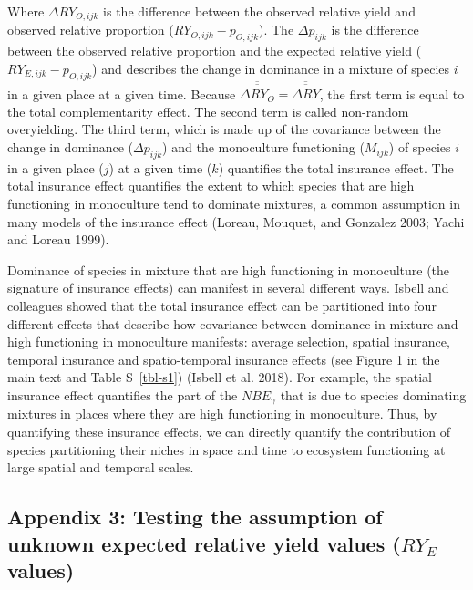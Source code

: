 \documentclass[
  letterpaper,
  DIV=11,
  numbers=noendperiod]{scrartcl}
\begin{document}
Where \(\Delta RY_{O, ijk}\) is the difference between the observed
relative yield and observed relative proportion
(\(RY_{O, ijk} - p_{O, ijk}\)). The \(\Delta p_{ijk}\) is the difference
between the observed relative proportion and the expected relative yield
(\(RY_{E, ijk} - p_{O, ijk}\)) and describes the change in dominance in
a mixture of species \(i\) in a given place at a given time. Because
\(\overline{\overline{\overline{\Delta RY_{O}}}} = \overline{\overline{\overline{\Delta RY}}}\),
the first term is equal to the total complementarity effect. The second
term is called non-random overyielding. The third term, which is made up
of the covariance between the change in dominance (\(\Delta p_{ijk}\))
and the monoculture functioning (\(M_{ijk}\)) of species \(i\) in a
given place (\(j\)) at a given time (\(k\)) quantifies the total
insurance effect. The total insurance effect quantifies the extent to
which species that are high functioning in monoculture tend to dominate
mixtures, a common assumption in many models of the insurance effect
(Loreau, Mouquet, and Gonzalez 2003; Yachi and Loreau 1999).

Dominance of species in mixture that are high functioning in monoculture
(the signature of insurance effects) can manifest in several different
ways. Isbell and colleagues showed that the total insurance effect can
be partitioned into four different effects that describe how covariance
between dominance in mixture and high functioning in monoculture
manifests: average selection, spatial insurance, temporal insurance and
spatio-temporal insurance effects (see Figure 1 in the main text and
Table S~\ref{tbl-s1}) (Isbell et al. 2018). For example, the spatial
insurance effect quantifies the part of the \(NBE_{\gamma}\) that is due
to species dominating mixtures in places where they are high functioning
in monoculture. Thus, by quantifying these insurance effects, we can
directly quantify the contribution of species partitioning their niches
in space and time to ecosystem functioning at large spatial and temporal
scales.

\subsection{\texorpdfstring{Appendix 3: Testing the assumption of
unknown expected relative yield values (\(RY_E\)
values)}{Appendix 3: Testing the assumption of unknown expected relative yield values (RY\_E values)}}\label{appendix-3-testing-the-assumption-of-unknown-expected-relative-yield-values-ry_e-values}
\end{document}
